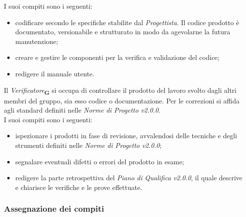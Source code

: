 I suoi compiti sono i seguenti:
\begin {itemize}
\item codificare secondo le specifiche stabilite dal \textit{Progettista}. Il codice prodotto è documentato, versionabile e strutturato in modo da agevolarne la futura manutenzione;
\item creare e gestire le componenti per la verifica e validazione del codice;
\item redigere il manuale utente.
\end {itemize}
Il \textit{Verificatore}\textsubscript{\textbf{G}} si occupa di controllare il prodotto del lavoro svolto dagli altri membri del gruppo, sia esso codice o documentazione. Per le correzioni si affida agli standard definiti nelle \textit{Norme di Progetto v2.0.0}.\\
I suoi compiti sono i seguenti:
\begin {itemize}
\item ispezionare i prodotti in fase di revisione, avvalendosi delle tecniche e degli strumenti definiti nelle \textit{Norme di Progetto v2.0.0};
\item segnalare eventuali difetti o errori del prodotto in esame;
\item redigere la parte retrospettiva del \textit{Piano di Qualifica v2.0.0}, il quale descrive e chiarisce le verifiche e le prove effettuate.
\end {itemize}
\subsubsection{Assegnazione dei compiti}

